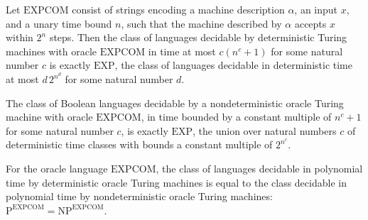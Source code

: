 \begin{theorem}
\label{Complexity.POracle_EXPCOM_eq_EXP}
\leanok
{}
Let $\mathrm{EXPCOM}$ consist of strings encoding a machine description $\alpha$, an
input $x$, and a unary time bound $n$, such that the machine described by $\alpha$
accepts $x$ within $ 2^n$ steps. Then the class of languages decidable by
deterministic Turing machines with oracle $\mathrm{EXPCOM}$ in time at most
$c(n^c+1)$ for some natural number $c$ is exactly $\mathrm{EXP}$, the class of
languages decidable in deterministic time at most $d\,2^{n^d}$ for some natural number
$d$.
\end{theorem}

\begin{theorem}
\label{Complexity.NPOracle_EXPCOM_eq_EXP}
\leanok
{}
The class of Boolean languages decidable by a nondeterministic oracle Turing machine
with oracle $\mathrm{EXPCOM}$, in time bounded by a constant multiple of $n^c+1$ for
some natural number $c$, is exactly $\mathrm{EXP}$, the union over natural numbers $c$
of deterministic time classes with bounds a constant multiple of $2^{n^c}$.
\end{theorem}

\begin{theorem}
\label{Complexity.POracle_EXPCOM_eq_NPOracle_EXPCOM}
\leanok
{}
For the oracle language $\mathrm{EXPCOM}$, the class of languages decidable in
polynomial time by deterministic oracle Turing machines is equal to the class decidable
in polynomial time by nondeterministic oracle Turing machines:
$\mathrm{P}^{\mathrm{EXPCOM}}=\mathrm{NP}^{\mathrm{EXPCOM}}$.
\end{theorem}
